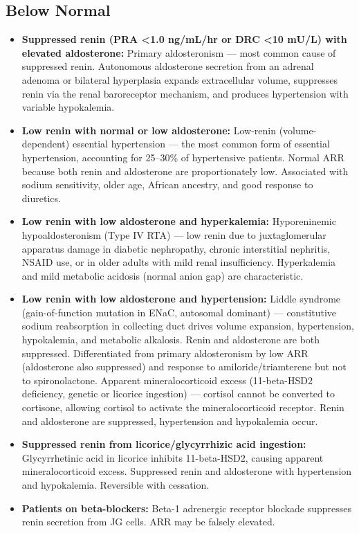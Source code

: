 \subsection*{Below Normal}
\begin{itemize}
  \item \textbf{Suppressed renin (PRA <1.0 ng/mL/hr or DRC <10 mU/L) with elevated aldosterone:} Primary aldosteronism --- most common cause of suppressed renin. Autonomous aldosterone secretion from an adrenal adenoma or bilateral hyperplasia expands extracellular volume, suppresses renin via the renal baroreceptor mechanism, and produces hypertension with variable hypokalemia.
  \item \textbf{Low renin with normal or low aldosterone:} Low-renin (volume-dependent) essential hypertension --- the most common form of essential hypertension, accounting for 25--30\% of hypertensive patients. Normal ARR because both renin and aldosterone are proportionately low. Associated with sodium sensitivity, older age, African ancestry, and good response to diuretics.
  \item \textbf{Low renin with low aldosterone and hyperkalemia:} Hyporeninemic hypoaldosteronism (Type IV RTA) --- low renin due to juxtaglomerular apparatus damage in diabetic nephropathy, chronic interstitial nephritis, NSAID use, or in older adults with mild renal insufficiency. Hyperkalemia and mild metabolic acidosis (normal anion gap) are characteristic.
  \item \textbf{Low renin with low aldosterone and hypertension:} Liddle syndrome (gain-of-function mutation in ENaC, autosomal dominant) --- constitutive sodium reabsorption in collecting duct drives volume expansion, hypertension, hypokalemia, and metabolic alkalosis. Renin and aldosterone are both suppressed. Differentiated from primary aldosteronism by low ARR (aldosterone also suppressed) and response to amiloride/triamterene but not to spironolactone. Apparent mineralocorticoid excess (11-beta-HSD2 deficiency, genetic or licorice ingestion) --- cortisol cannot be converted to cortisone, allowing cortisol to activate the mineralocorticoid receptor. Renin and aldosterone are suppressed, hypertension and hypokalemia occur.
  \item \textbf{Suppressed renin from licorice/glycyrrhizic acid ingestion:} Glycyrrhetinic acid in licorice inhibits 11-beta-HSD2, causing apparent mineralocorticoid excess. Suppressed renin and aldosterone with hypertension and hypokalemia. Reversible with cessation.
  \item \textbf{Patients on beta-blockers:} Beta-1 adrenergic receptor blockade suppresses renin secretion from JG cells. ARR may be falsely elevated.
\end{itemize}

